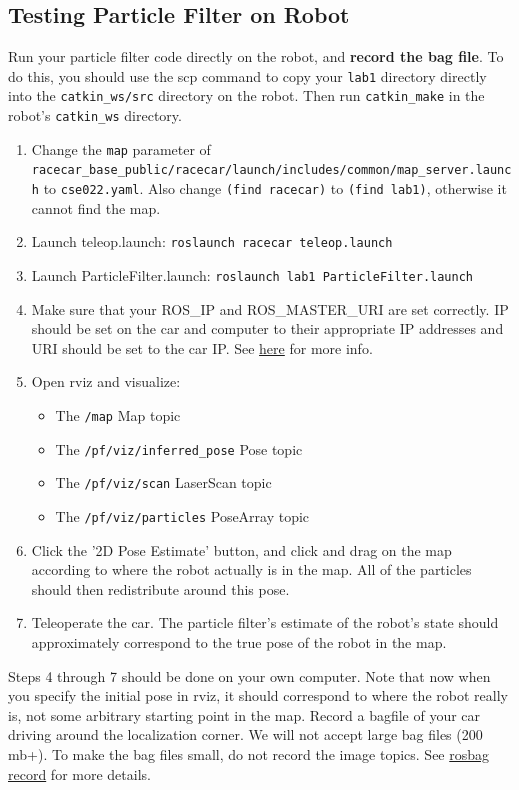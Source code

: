 \documentclass[final]{article}
\begin{document}
\subsection{Testing Particle Filter on Robot}

Run your particle filter code directly on the robot, and \textbf{record the bag file}. To do this, you should use the scp command to copy your \texttt{lab1} directory directly into the \texttt{catkin\_ws/src} directory on the robot. Then run \texttt{catkin\_make} in the robot's \texttt{catkin\_ws} directory.

\begin{enumerate}
\item Change the \texttt{map} parameter of \texttt{racecar\_base\_public/racecar/launch/includes/common/map\_server.launch} to \texttt{cse022.yaml}. Also change \texttt{(find racecar)} to \texttt{(find lab1)}, otherwise it cannot find the map.
\item Launch teleop.launch: \texttt{roslaunch racecar teleop.launch}
\item Launch ParticleFilter.launch: \texttt{roslaunch lab1 ParticleFilter.launch}
\item Make sure that your ROS\_IP and ROS\_MASTER\_URI are set correctly. IP should be set on the car and computer to their appropriate IP addresses and URI should be set to the car IP. See \href{http://wiki.ros.org/ROS/EnvironmentVariables#ROS_MASTER_URI}{here} for more info.
\item Open rviz and visualize:
	\begin{itemize}
	    \item The \texttt{/map} Map topic
		\item The \texttt{/pf/viz/inferred\_pose} Pose topic
		\item The \texttt{/pf/viz/scan} LaserScan topic
		\item The \texttt{/pf/viz/particles} PoseArray topic
	\end{itemize}
\item Click the '2D Pose Estimate' button, and click and drag on the map according to where the robot actually is in the map. All of the particles should then redistribute around this pose.
\item Teleoperate the car. The particle filter's estimate of the robot's state should approximately correspond to the true pose of the robot in the map.
\end{enumerate}

Steps 4 through 7 should be done on your own computer. Note that now when you specify the initial pose in rviz, it should correspond to where the robot really is, not some arbitrary starting point in the map. Record a bagfile of your car driving around the localization corner. We will not accept large bag files (200 mb+). To make the bag files small, do not record the image topics. See \href{http://wiki.ros.org/rosbag/Commandline#record}{rosbag record} for more details.
\end{document}

